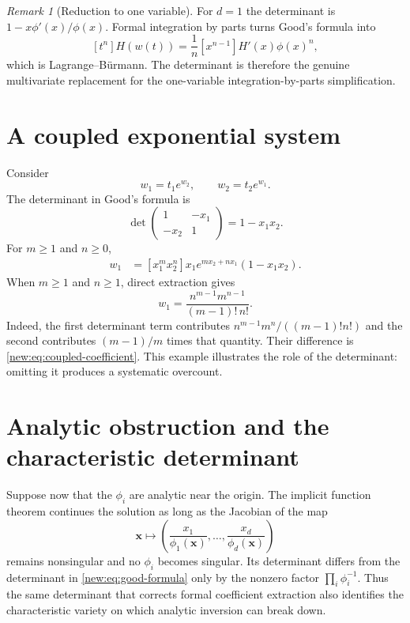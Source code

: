 \documentclass[11pt,a4paper,oneside,openany]{book}
\theoremstyle{definition}
\theoremstyle{remark}
\newtheorem{remark}[theorem]{Remark}
\begin{document}
\begin{remark}[Reduction to one variable]
For $d=1$ the determinant is $1-x\phi'(x)/\phi(x)$.  Formal integration by
parts turns Good's formula into
\[
 [t^n]H(w(t))=\frac1n[x^{n-1}]H'(x)\phi(x)^n,
\]
which is Lagrange--B\"urmann.  The determinant is therefore the genuine
multivariate replacement for the one-variable integration-by-parts
simplification.
\end{remark}

\section{A coupled exponential system}

Consider
\begin{equation}
 w_1=t_1e^{w_2},\qquad w_2=t_2e^{w_1}.
 \label{new:eq:coupled-exponential}
\end{equation}
The determinant in Good's formula is
\[
 \det\begin{pmatrix}1&-x_1\\-x_2&1\end{pmatrix}=1-x_1x_2.
\]
For $m\ge1$ and $n\ge0$,
\begin{align*}
 [t_1^mt_2^n]w_1
 &=[x_1^mx_2^n]x_1e^{mx_2+nx_1}(1-x_1x_2).
\end{align*}
When $m\ge1$ and $n\ge1$, direct extraction gives
\begin{equation}
 [t_1^mt_2^n]w_1
 =\frac{n^{m-1}m^{n-1}}{(m-1)!\,n!}.
 \label{new:eq:coupled-coefficient}
\end{equation}
Indeed, the first determinant term contributes
$n^{m-1}m^n/((m-1)!n!)$ and the second contributes $(m-1)/m$ times that
quantity.  Their difference is \eqref{new:eq:coupled-coefficient}.  This
example illustrates the role of the determinant: omitting it produces a
systematic overcount.

\section{Analytic obstruction and the characteristic determinant}

Suppose now that the $\phi_i$ are analytic near the origin.  The implicit
function theorem continues the solution as long as the Jacobian of the map
\[
 \boldsymbol x\longmapsto
 \left(\frac{x_1}{\phi_1(\boldsymbol x)},\ldots,
       \frac{x_d}{\phi_d(\boldsymbol x)}\right)
\]
remains nonsingular and no $\phi_i$ becomes singular.  Its determinant differs
from the determinant in \eqref{new:eq:good-formula} only by the nonzero factor
$\prod_i\phi_i^{-1}$.  Thus the same determinant that corrects formal
coefficient extraction also identifies the characteristic variety on which
analytic inversion can break down.
\end{document}
